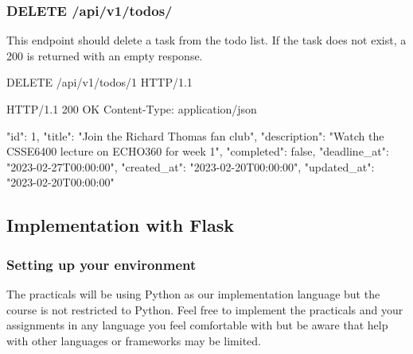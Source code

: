 \documentclass{csse4400}
\begin{document}
\subsubsection{DELETE /api/v1/todos/}
This endpoint should delete a task from the todo list.
If the task does not exist, a 200 is returned with an empty response.

\begin{code}[language=json,numbers=none]{}
DELETE /api/v1/todos/1 HTTP/1.1
\end{code}
\begin{code}[language=json,numbers=none]{}
HTTP/1.1 200 OK
Content-Type: application/json

{
    "id": 1,
    "title": "Join the Richard Thomas fan club",
    "description": "Watch the CSSE6400 lecture on ECHO360 for week 1",
    "completed": false,
    "deadline_at": "2023-02-27T00:00:00",
    "created_at": "2023-02-20T00:00:00",
    "updated_at": "2023-02-20T00:00:00"
}
\end{code}


\subsection{Implementation with Flask}

\subsubsection{Setting up your environment}

The practicals will be using Python as our implementation language but the course is not restricted to Python.
Feel free to implement the practicals and your assignments in any language you feel comfortable with but be aware that help with other languages or frameworks may be limited.


\end{document}
